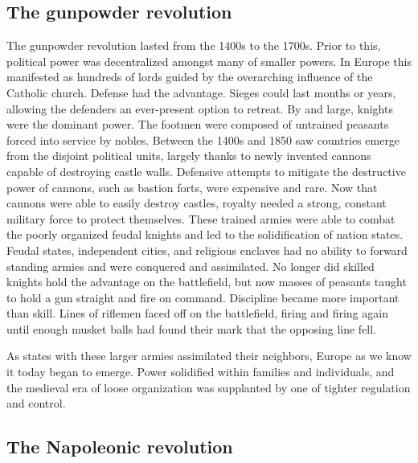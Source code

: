 \documentclass[nobib]{tufte-handout}
\begin{document}
\subsection{The gunpowder revolution}
The gunpowder revolution lasted from the 1400s to the 1700s.
Prior to this, political power was decentralized amongst many 
of smaller powers. In Europe this manifested as hundreds of lords 
guided by the overarching influence of the Catholic church. Defense had the advantage. 
Sieges could last months or years, allowing the defenders an ever-present option to retreat. 
By and large, knights were the dominant power. The footmen were composed of untrained peasants 
forced into service by nobles. Between the 1400s and 1850 saw countries emerge from the 
disjoint political units, largely thanks to newly invented cannons capable of destroying castle walls. 
Defensive attempts to mitigate the destructive power of cannons, such as bastion forts, were expensive
and rare. Now that cannons were able to easily destroy castles, 
royalty needed a strong, constant military force to protect themselves. 
These trained armies were able to combat the poorly organized feudal knights 
and led to the solidification of nation states. Feudal states, independent cities, 
and religious enclaves had no ability to forward standing armies and were conquered 
and assimilated. No longer did skilled knights hold the advantage on the battlefield, 
but now masses of peasants taught to hold a gun straight and fire on command. 
Discipline became more important than skill. Lines of riflemen 
faced off on the battlefield, firing and firing again 
until enough musket balls had found their mark that the opposing line 
fell. 

As states with these larger armies assimilated their 
neighbors, Europe as we know it today began 
to emerge. Power solidified within families 
and individuals, and the medieval era of loose organization 
was supplanted by one of tighter regulation and control. 

\subsection{The Napoleonic revolution}
\end{document}
